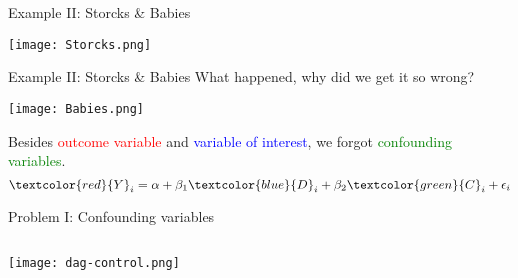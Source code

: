 \documentclass[aspectratio=169]{beamer}
\begin{document}
	\begin{frame}{Example II:  Storcks \& Babies }
		\begin{center}
		\texttt{[image: Storcks.png]}
		\end{center}
	\end{frame}


	\begin{frame}{Example II:  Storcks \& Babies }
		What happened, why did we get it so wrong?
		\begin{center}
		\texttt{[image: Babies.png]}
		\end{center}
		\footnotesize{Besides \textcolor{red}{outcome variable} and \textcolor{blue}{variable of interest}, we forgot \textcolor{green}{confounding variables}.}
		\begin{equation}
			\textcolor{red}{Y}_i = \alpha + \beta_1 \textcolor{blue}{D}_i + \beta_2 \textcolor{green}{C}_i + \epsilon_i
		\end{equation}
	\end{frame}


	\begin{frame}{Problem I: Confounding variables}
		\begin{columns}
			\begin{column}{0.5\textwidth}
				\begin{center}
				\texttt{[image: dag-control.png]}
				\end{center}
			\end{column}
			\begin{column}{0.5\textwidth}  %
			    \begin{center}
			    \end{center}
			\end{column}
		\end{columns}
	\end{frame}

\end{document}
